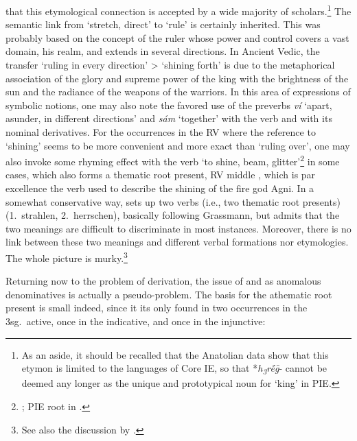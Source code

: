 \documentclass[output=paper,colorlinks,citecolor=brown]{langscibook}
\begin{document}
that this etymological connection is accepted by a wide majority of scholars.\footnote{As an aside, it should be recalled that the Anatolian data show that this etymon is limited to the languages of Core IE, so that *\textit{h\textsubscript{3}rḗg̑}- cannot be deemed any longer as the unique and prototypical noun for ‘king’ in PIE.}   The semantic link from ‘stretch, direct’ to ‘rule’ is certainly inherited. This was probably based on the concept of the ruler whose power and control covers a vast domain, his realm, and extends in several directions. In Ancient Vedic, the transfer ‘ruling in every direction’ > ‘shining forth’ is due to the metaphorical association of the glory and supreme power of the king with the brightness of the sun and the radiance of the weapons of the warriors. In this area of expressions of symbolic notions, one may also note the favored use of the preverbs \textit{ví} ‘apart, asunder, in different directions’ and \textit{sám} ‘together’ with the verb  and with its nominal derivatives. For the occurrences in the RV where the reference to ‘shining’ seems to be more convenient and more exact than ‘ruling over’, one may also invoke some rhyming effect with the verb  ‘to shine, beam, glitter’\footnote{; PIE root  in .} in some cases, which also forms a thematic root present, RV middle , which is par excellence the verb used to describe the shining of the fire god Agni.  In a somewhat conservative way, \citet[267--271]{Goto1987} sets up two verbs (i.e., two thematic root presents)  (1.\ strahlen, 2.\ herrschen), basically following Grassmann, but admits that the two meanings are difficult to discriminate in most instances. Moreover, there is no link between these two meanings and different verbal formations nor etymologies. The whole picture is murky.\footnote{See also the discussion by \citet[445--446]{Scarlata1999}.} 

Returning now to the problem of derivation, the issue of  and  as anomalous denominatives is actually a pseudo-problem. The basis for the athematic root present is small indeed, since it its only found in two occurrences in the  3sg.\ active, once in the indicative, and once in the injunctive: 
\end{document}
